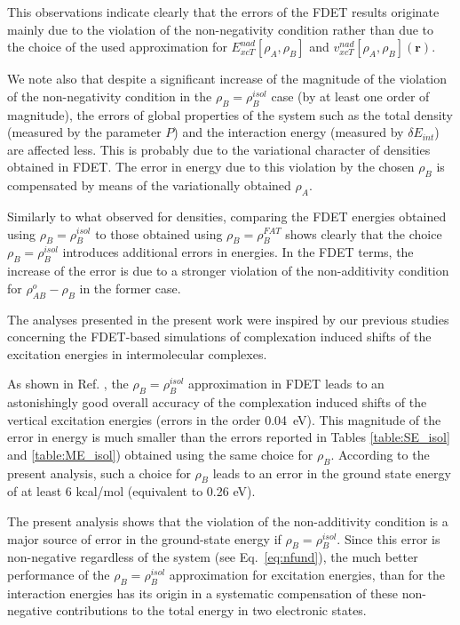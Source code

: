 \documentclass[amsmath,amssymb,preprint,aip,jcp]{revtex4-1}
\begin{document}
This observations indicate clearly that the errors of the FDET results originate mainly due to the violation of the non-negativity condition rather than due to the choice of the used approximation for ${E}_{xcT}^{nad}[\rho_A,\rho_B]$ and ${v}_{xcT}^{nad}[\rho_A,\rho_B](\mathbf{r})$.

We note also that despite a significant increase of the magnitude of the violation of the non-negativity condition in the $\rho_B=\rho_B^{isol}$ case (by at least one order of magnitude), the errors of global properties of the system such as the total density (measured by the parameter $P$) and the interaction energy (measured by $\delta E_{int}$) are affected less. This is probably due to the variational character of densities obtained in FDET. The error in energy due to this violation by the chosen $\rho_B$ is compensated by means of the variationally obtained $\rho_A$.

Similarly to what observed for densities, comparing the FDET energies obtained using $\rho_B=\rho_B^{isol}$ to those obtained using $\rho_B=\rho_B^{FAT}$ shows clearly that the choice $\rho_B=\rho_B^{isol}$ introduces additional errors in energies. In the FDET terms, the increase of the error is due to a stronger violation of the non-additivity condition for $\rho^{o}_{AB}-\rho_B$ in the former case.

The analyses presented in the present work were inspired by our previous studies concerning the FDET-based simulations of complexation induced shifts of the excitation energies in intermolecular complexes.

As shown in Ref. , the $\rho_B=\rho_B^{isol}$ approximation in FDET leads to an astonishingly good overall accuracy of the complexation induced shifts of the vertical excitation energies (errors in the order 0.04~eV). This magnitude of the error in energy is much smaller than the errors reported in Tables \ref{table:SE_isol} and \ref{table:ME_isol}) obtained using the same choice for $\rho_B$. 
According to the present analysis, such a choice for 
$\rho_B$ leads to an error in the ground state energy of at least 6 kcal/mol (equivalent to 0.26 eV).

The present analysis shows that the violation of the non-additivity condition is a major source of error in the ground-state energy if $\rho_B=\rho_B^{isol}$. Since this error is non-negative regardless of the system (see Eq.~\ref{eq:nfund}),
the much better performance of the $\rho_B=\rho_B^{isol}$ approximation for excitation energies\cite{Ricardi2018}, than for the interaction energies has its origin in a systematic compensation of these non-negative contributions to the total energy in two electronic states. 
\end{document}
